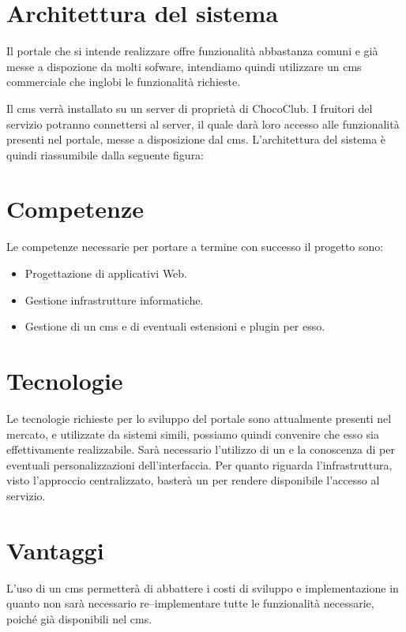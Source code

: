 \section{Architettura del sistema} 
\label{sec:architettura_sistema}
Il portale che si intende realizzare offre funzionalità abbastanza comuni e già messe a dispozione da molti sofware, intendiamo quindi utilizzare un \gls{cms} commerciale che inglobi le funzionalità richieste.

Il \gls{cms} verrà installato su un server di proprietà di ChocoClub.
I fruitori del servizio potranno connettersi al server, il quale darà loro accesso alle funzionalità presenti nel portale, messe a disposizione dal \gls{cms}.
L'architettura del sistema è quindi riassumibile dalla seguente figura:

\section{Competenze} 
\label{sec:competenze}
Le competenze necessarie per portare a termine con successo il progetto sono:
\begin{itemize}
	\item Progettazione di applicativi Web.
	\item Gestione infrastrutture informatiche.
	\item Gestione di un \gls{cms} e di eventuali estensioni e plugin per esso.
\end{itemize}

\section{Tecnologie}
\label{sec:tecnologie}
Le tecnologie richieste per lo sviluppo del portale sono attualmente presenti nel mercato, e utilizzate da sistemi simili, possiamo quindi convenire che esso sia effettivamente realizzabile.
Sarà necessario l'utilizzo di un  e la conoscenza di  per eventuali personalizzazioni dell'interfaccia.
Per quanto riguarda l'infrastruttura, visto l'approccio centralizzato, basterà un  per rendere disponibile l'accesso al servizio.

\section{Vantaggi} 
\label{sec:vantaggi}
L'uso di un \gls{cms} permetterà di abbattere i costi di sviluppo e implementazione in quanto non sarà necessario re--implementare tutte le funzionalità necessarie, poiché già disponibili nel \gls{cms}.

